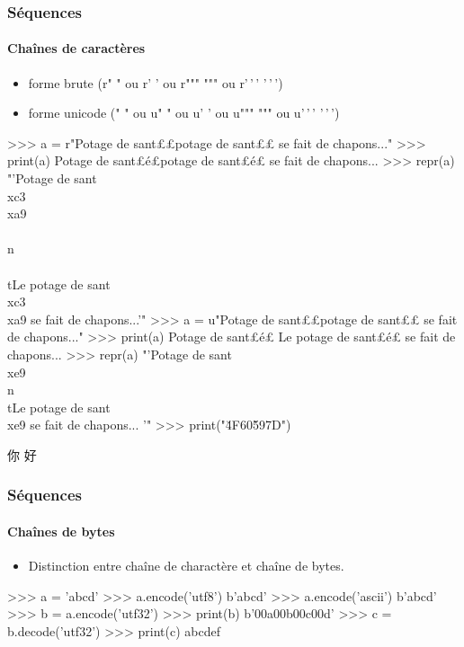 \begin{frame}[fragile]
\frametitle{Séquences}
\framesubtitle{Chaînes de caractères}
\begin{itemize}
 \item forme brute (r" " ou r' ' ou r""" """ ou r'\,'\,' '\,'\,')
 \item forme unicode (" " ou u" " ou u' ' ou u""" """ ou u'\,'\,' '\,'\,')
\end{itemize}
\begin{pythonConsole}
>>> a = r"Potage de sant£\color{magenta}{é}£\n\tLe potage de sant£\color{magenta}{é}£ se fait de chapons..."
>>> print(a)
Potage de sant£é£\n\tLe potage de sant£é£ se fait de chapons...
>>> repr(a)
"'Potage de sant\\xc3\\xa9\\\\n\\\\tLe potage de sant\\xc3\\xa9 se fait 
de chapons...'"
>>> a = u"Potage de sant£\color{magenta}{é}£\n\tLe potage de sant£\color{magenta}{é}£ se fait de chapons..."
>>> print(a)
Potage de sant£é£
    Le potage de sant£é£ se fait de chapons...
>>> repr(a)
"'Potage de sant\\xe9\\n\\tLe potage de sant\\xe9 se fait de chapons...
'"
>>> print("\u4F60\u597D")
\end{pythonConsole}
\begin{CJK*}{UTF8}{gbsn}
你 好
\end{CJK*}
\end{frame}
\begin{frame}[fragile]
\frametitle{Séquences}
\framesubtitle{Chaînes de bytes}
\begin{itemize}
 \item Distinction entre chaîne de charactère et chaîne de bytes.  
\end{itemize}
\begin{pythonConsole}
>>> a = 'abcd'
>>> a.encode('utf8')
b'abcd'
>>> a.encode('ascii')
b'abcd'
>>> b = a.encode('utf32')
>>> print(b)
b'\xff\xfe{}\x00a\x00b\x00c\x00d'
>>> c = b.decode('utf32')
>>> print(c)
abcdef
\end{pythonConsole}
\end{frame}
